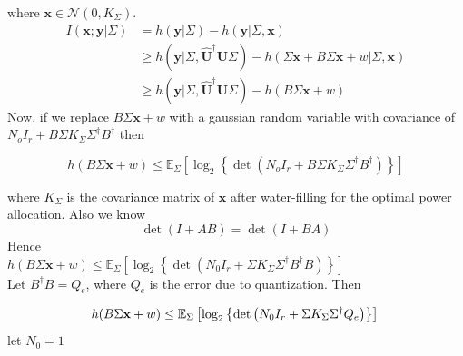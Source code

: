\documentclass[conference]{IEEEtran}
\def\bU{\mathbf{U}}
\def\bx{\mathbf{x}}
\def\by{\mathbf{y}}
\begin{document}
where $\bx \in \mathcal{N}(0,K_{\Sigma})$.
\begin{equation} \label{eq:1}
	\begin{split}
		I(\bx;\by |\Sigma) & = h(\by|\Sigma) - h(\by|\Sigma,\bx)\\
		&\geq h(\by|\Sigma,\hat{\bU}^{\dagger}\bU\Sigma) - h(\Sigma \bx + B \Sigma \bx + w|\Sigma,\bx)\\
		&\geq h(\by|\Sigma,\hat{\bU}^{\dagger}\bU\Sigma) - h(B \Sigma \bx + w)
	\end{split}
\end{equation}
Now, if we replace $B\Sigma \bx+w$ with a gaussian random variable with covariance of $N_oI_r+B\Sigma K_\Sigma \Sigma^{\dagger}B^{\dagger}$ then

\begin{equation*}
h(B\Sigma \bx+w) \leq \mathbb{E}_{\Sigma}\left[\log_{2} \left\{\det
    \left(N_oI_r+B\Sigma K_\Sigma
      \Sigma^{\dagger}B^{\dagger}\right)\right\}\right]
\end{equation*}

where $K_\Sigma$ is the covariance matrix of $\bx$ after water-filling for the optimal power allocation.
Also we know
\begin{equation*}
\det(I+AB) = \det(I+BA)
\end{equation*}
Hence\\
    $h(B\Sigma \bx+w) \leq \mathbb{E}_{\Sigma}\left[\log_{2} \left\{\det \left(N_0I_r+\Sigma K_\Sigma \Sigma^{\dagger}B^{\dagger}B\right)\right\}\right]$\\
Let $B^{\dagger}B = Q_{e}$, where $Q_e$ is the error due to quantization. Then

\begin{equation} \label{eq:2}
    h(B\Sigma \bx+w) \leq \mathbb{E}_{\Sigma}\left[\log_{2} \left\{\det \left(N_0I_r+\Sigma K_\Sigma \Sigma^{\dagger}Q_e\right)\right\}\right]\\
\end{equation}
let
$N_0 = 1$
\end{document}

